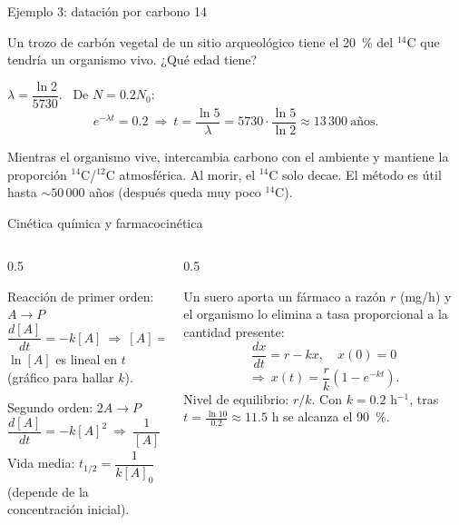 \documentclass[10pt,aspectratio=169]{beamer}
\begin{document}
\begin{frame}{Ejemplo 3: datación por carbono 14}
  \begin{ejemplo}
    Un trozo de carbón vegetal de un sitio arqueológico tiene el 20~\% del $^{14}$C que tendría un organismo vivo. ¿Qué edad tiene?

    $\lambda=\dfrac{\ln2}{5730}$. \ De $N=0.2N_0$:
    \[ e^{-\lambda t}=0.2\ \Rightarrow\ t=\frac{\ln5}{\lambda}=5730\cdot\frac{\ln5}{\ln2}\approx13\,300\ \text{años}. \]
  \end{ejemplo}
  \begin{observacion}
    Mientras el organismo vive, intercambia carbono con el ambiente y mantiene la proporción $^{14}$C/$^{12}$C atmosférica.
    Al morir, el $^{14}$C solo decae. El método es útil hasta $\sim50\,000$ años (después queda muy poco $^{14}$C).
  \end{observacion}
\end{frame}

\begin{frame}{Cinética química y farmacocinética}
  \begin{columns}
    \begin{column}{0.5\textwidth}
      \begin{block}{Reacción de primer orden: $A\to P$}
        \[ \frac{d[A]}{dt}=-k[A]\ \Rightarrow\ [A]=[A]_0e^{-kt}. \]
        $\ln[A]$ es lineal en $t$ (gráfico para hallar $k$).
      \end{block}
      \begin{block}{Segundo orden: $2A\to P$}
        \[ \frac{d[A]}{dt}=-k[A]^2\ \Rightarrow\ \frac{1}{[A]}=\frac1{[A]_0}+kt. \]
        Vida media: $t_{1/2}=\dfrac{1}{k[A]_0}$ (depende de la concentración inicial).
      \end{block}
    \end{column}
    \begin{column}{0.5\textwidth}
      \begin{ejemplo}
        Un suero aporta un fármaco a razón $r$ (mg/h) y el organismo lo elimina a tasa proporcional a la cantidad presente:
        \[ \frac{dx}{dt}=r-kx,\quad x(0)=0 \]
        \[ \Rightarrow\ x(t)=\frac rk\left(1-e^{-kt}\right). \]
        Nivel de equilibrio: $r/k$. Con $k=0.2$ h$^{-1}$, tras $t=\frac{\ln 10}{0.2}\approx11.5$ h se alcanza el 90~\%.
      \end{ejemplo}
    \end{column}
  \end{columns}
\end{frame}
\end{document}
